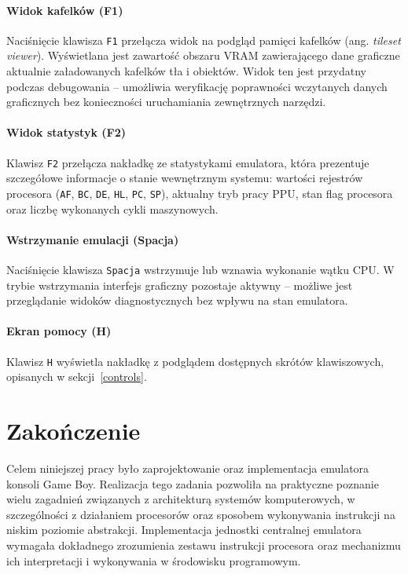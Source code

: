 \documentclass{article}
\begin{document}
\paragraph{Widok kafelków (F1)}
Naciśnięcie klawisza \texttt{F1} przełącza widok na podgląd pamięci kafelków
(ang. \textit{tileset viewer}). Wyświetlana jest zawartość obszaru VRAM
zawierającego dane graficzne aktualnie załadowanych kafelków tła i obiektów.
Widok ten jest przydatny podczas debugowania -- umożliwia weryfikację poprawności
wczytanych danych graficznych bez konieczności uruchamiania zewnętrznych narzędzi.

\paragraph{Widok statystyk (F2)}
Klawisz \texttt{F2} przełącza nakładkę ze statystykami emulatora, która
prezentuje szczegółowe informacje o stanie wewnętrznym systemu: wartości rejestrów
procesora (\texttt{AF}, \texttt{BC}, \texttt{DE}, \texttt{HL}, \texttt{PC},
\texttt{SP}), aktualny tryb pracy PPU, stan flag procesora oraz liczbę
wykonanych cykli maszynowych.

\paragraph{Wstrzymanie emulacji (Spacja)}
Naciśnięcie klawisza \texttt{Spacja} wstrzymuje lub wznawia wykonanie wątku CPU.
W trybie wstrzymania interfejs graficzny pozostaje aktywny -- możliwe jest
przeglądanie widoków diagnostycznych bez wpływu na stan emulatora. 
\paragraph{Ekran pomocy (H)}
Klawisz \texttt{H} wyświetla nakładkę z podglądem dostępnych skrótów klawiszowych,
opisanych w sekcji~\ref{controls}.
\newpage
\section{Zakończenie}

Celem niniejszej pracy było zaprojektowanie oraz implementacja emulatora konsoli Game Boy. Realizacja tego zadania pozwoliła na praktyczne poznanie wielu zagadnień związanych z architekturą systemów komputerowych, w szczególności z działaniem procesorów oraz sposobem wykonywania instrukcji na niskim poziomie abstrakcji. Implementacja jednostki centralnej emulatora wymagała dokładnego zrozumienia zestawu instrukcji procesora oraz mechanizmu ich interpretacji i wykonywania w środowisku programowym.
\end{document}
